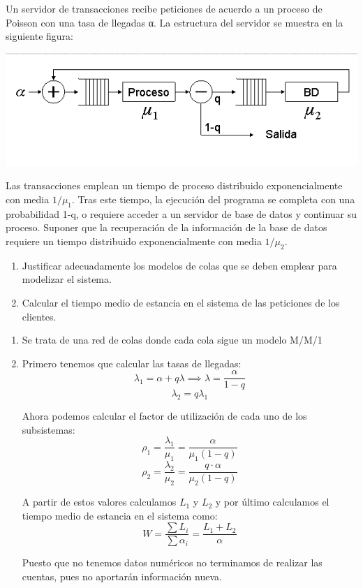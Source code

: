 \begin{problem}[15]\label{tema2:prob15}
Un servidor de transacciones recibe peticiones de acuerdo a un proceso de Poisson con una tasa de llegadas α. La estructura del servidor se muestra en la siguiente figura:

\begin{center}
  \includegraphics[keepaspectratio=true,width=\linewidth]{img/ej15.png}
\end{center}

Las transacciones emplean un tiempo de proceso distribuido exponencialmente con media $1/μ_1$. Tras este tiempo, la ejecución del programa se completa con una probabilidad 1-q, o requiere acceder a un servidor de base de datos y continuar su proceso. Suponer que la recuperación de la información de la base de datos requiere un tiempo distribuido exponencialmente con media $1/μ_2$.
\begin{enumerate}
\item Justificar adecuadamente los modelos de colas que se deben emplear para modelizar el sistema.
\item Calcular el tiempo medio de estancia en el sistema de las peticiones de los clientes.
\end{enumerate}
\solution

\yoP


\begin{enumerate}
\item Se trata de una red de colas donde cada cola sigue un modelo M/M/1

\item

Primero tenemos que calcular las tasas de llegadas:
\[λ_1 = α+qλ \implies λ = \frac{α}{1-q}\]
\[λ_2 = q λ_1\]

Ahora podemos calcular el factor de utilización de cada uno de los subsistemas:
\[ρ_1 = \frac{λ_1}{μ_1} = \frac{α}{μ_1(1-q)}\]
\[ρ_2 = \frac{λ_2}{μ_2} = \frac{q\cdot α}{μ_2(1-q)}\]

A partir de estos valores calculamos $L_1$ y $L_2$ y por último calculamos el tiempo medio de estancia en el sistema como:
\[W = \frac{\sum L_i}{\sum α_i}=\frac{L_1+L_2}{α}\]

Puesto que no tenemos datos numéricos no terminamos de realizar las cuentas, pues no aportarán información nueva.
\end{enumerate}

\end{problem}


